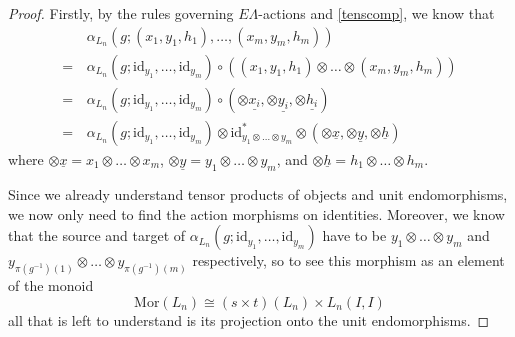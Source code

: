 \documentclass{amsbook} %
\newcommand{\id}{\textrm{id}}
\newcommand{\MorLn}{\mathrm{Mor}(L_n)}
\numberwithin{section}{chapter}
\begin{document}
\begin{proof}
Firstly, by the rules governing $E\Lambda$-actions and \cref{tenscomp}, we know that
  \begin{align*}
    &\alpha_{L_n}(g;(x_1,y_1,h_1),\ldots,(x_m,y_m,h_m)) \\
    = \, &\alpha_{L_n}(g;\id_{y_1},\ldots,\id_{y_m}) \circ ((x_1,y_1,h_1) \otimes \ldots \otimes (x_m,y_m,h_m)) \\
    = \, &\alpha_{L_n}(g;\id_{y_1},\ldots,\id_{y_m}) \circ \left(\otimes \underline{x_i}, \otimes \underline{y_i}, \otimes \underline{h_i}\right) \\
    = \, &\alpha_{L_n}(g;\id_{y_1},\ldots,\id_{y_m}) \otimes \id^{\ast}_{y_1 \otimes \ldots \otimes y_m} \otimes \left(\otimes \underline{x}, \otimes \underline{y}, \otimes \underline{h}\right)
  \end{align*}
where $\otimes \underline{x} = x_1 \otimes \ldots \otimes x_m$, $\otimes \underline{y} = y_1 \otimes \ldots \otimes y_m$, and $\otimes \underline{h} = h_1 \otimes \ldots \otimes h_m$.

Since we already understand tensor products of objects and unit endomorphisms, we now only need to find the action morphisms on identities. Moreover, we know that the source and target of $\alpha_{L_n}(g; \id_{y_1}, \ldots, \id_{y_m})$ have to be $y_1 \otimes \ldots \otimes y_m$ and $y_{\pi(g^{-1})(1)} \otimes \ldots \otimes y_{\pi(g^{-1})(m)}$ respectively, so to see this morphism as an element of the monoid
  \[
    \MorLn \cong (s \times t)(L_n) \times L_n(I,I)
  \]
all that is left to understand is its projection onto the unit endomorphisms.


\end{proof}
\end{document}

